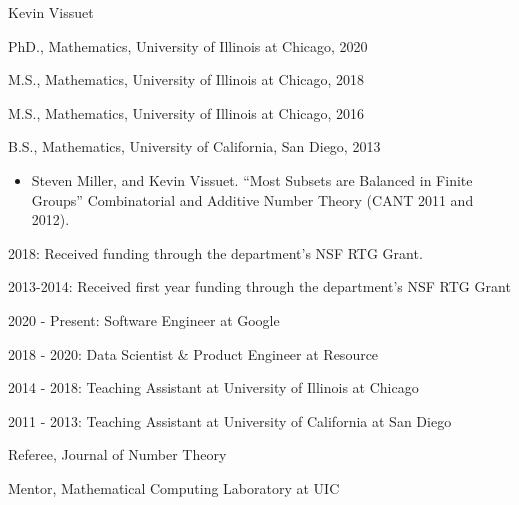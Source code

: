 \vita
\begin{singlespace}
    \begin{description}[labelwidth=4cm,leftmargin=4.2cm,itemsep=1em]

        \item[NAME] Kevin Vissuet

        \item[EDUCATION] PhD., Mathematics, University of Illinois at Chicago, 2020
        \item M.S., Mathematics, University of Illinois at Chicago, 2018
        \item M.S., Mathematics, University of Illinois at Chicago, 2016
        \item B.S., Mathematics, University of California, San Diego, 2013

        \item[PUBLICATIONS]
            \begin{itemize}[label={},listparindent=0pt,itemindent=0pt,leftmargin=0pt,itemsep=1em,parsep=0pt,topsep=0pt,partopsep=0pt]

                \item Steven Miller, and Kevin Vissuet. %
                ``Most Subsets are Balanced in Finite Groups'' %
                Combinatorial and Additive Number Theory  (CANT 2011 and 2012).

            \end{itemize}
            
        \item[AWARDS] 2018: Received funding through the department’s NSF RTG Grant.
        
        \item 2013-2014: Received first year funding through the department’s NSF RTG
Grant

        \item[EXPERIENCE] 2020 - Present: Software Engineer at Google
        
        \item 2018 - 2020: Data Scientist \& Product Engineer at Resource
        
        \item 2014 - 2018: Teaching Assistant at University of Illinois at Chicago
        
        \item 2011 - 2013: Teaching Assistant at University of California at San Diego
        
        \item[VOLUNTEER] Referee, Journal of Number Theory
        
        \item Mentor, Mathematical Computing Laboratory at UIC
        
    \end{description}
\end{singlespace}
